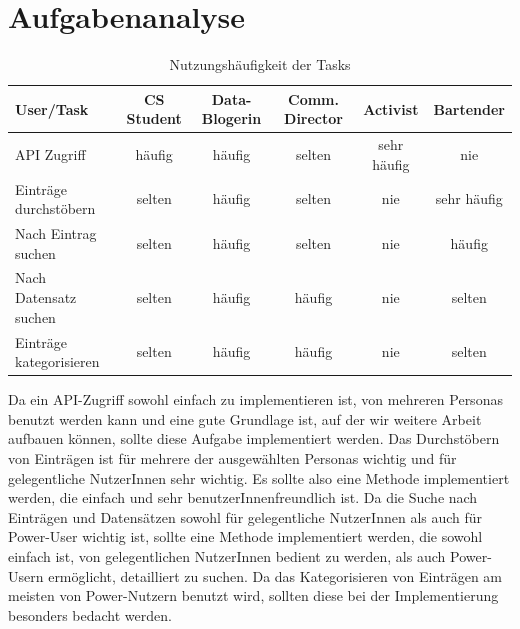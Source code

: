 \section{Aufgabenanalyse}
\begin{table}[htbp]
  \centering
  \begin{tabular}{|l|c|c|c|c|c|}
    \hline
    \textbf{User/Task} & \textbf{CS Student} & \textbf{Data-Blogerin} & \textbf{Comm. Director} & \textbf{Activist} & \textbf{Bartender} \\ \hline
    API Zugriff & häufig & häufig & selten & sehr häufig & nie \\ \hline
    Einträge durchstöbern & selten & häufig & selten & nie & sehr häufig \\ \hline
    Nach Eintrag suchen & selten & häufig & selten & nie & häufig \\ \hline
    Nach Datensatz suchen & selten & häufig & häufig & nie & selten \\ \hline
    Einträge kategorisieren & selten & häufig & häufig & nie & selten \\ \hline
  \end{tabular}
  \caption{Nutzungshäufigkeit der Tasks}
\end{table}
%
\bigskip
Da ein API-Zugriff sowohl einfach zu implementieren ist, von mehreren Personas benutzt werden kann und eine gute Grundlage ist, auf der wir weitere Arbeit aufbauen können, sollte diese Aufgabe implementiert werden. Das Durchstöbern von Einträgen ist für mehrere der ausgewählten Personas wichtig und für gelegentliche NutzerInnen sehr wichtig. Es sollte also eine Methode implementiert werden, die einfach und sehr benutzerInnenfreundlich ist. Da die Suche nach Einträgen und Datensätzen sowohl für gelegentliche NutzerInnen als auch für Power-User wichtig ist, sollte eine Methode implementiert werden, die sowohl einfach ist, von gelegentlichen NutzerInnen bedient zu werden, als auch Power-Usern ermöglicht, detailliert zu suchen. Da das Kategorisieren von Einträgen am meisten von Power-Nutzern benutzt wird, sollten diese bei der Implementierung besonders bedacht werden.
